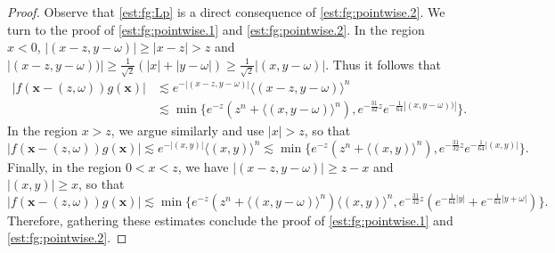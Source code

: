 \documentclass[reqno,10pt]{amsart}
\numberwithin{equation}{section}
\newcommand{\bx}{\mathbf{x}}
\begin{document}
	\begin{proof}
		Observe that \eqref{est:fg:Lp} is a direct consequence of \eqref{est:fg:pointwise.2}. We turn to the proof of \eqref{est:fg:pointwise.1} and \eqref{est:fg:pointwise.2}. In the region $x<0$, $|(x-z,y-\omega)| \ge |x-z|>z$ and $|(x-z,y-\omega))| \ge \frac1{\sqrt{2}}(|x|+|y-\omega|) \ge \frac1{\sqrt{2}}|(x,y-\omega)|$. Thus it follows that
		\begin{align*}
		  \left|f(\bx-(z,\omega))g(\bx) \right| & \lesssim e^{-|(x-z,y-\omega)|} \langle (x-z,y-\omega) \rangle^n \\ 
   & \lesssim \min\{ e^{-z}(z^n+\langle (x,y-\omega)\rangle^n),e^{-\frac{31}{32}z}e^{-\frac1{64}|(x,y-\omega))|}\} .
		\end{align*}
		In the region $x>z$, we argue similarly and use $|x|>z$, so that 
		\begin{equation*}
			\left|f(\bx-(z,\omega))g(\bx) \right| \lesssim e^{-|(x,y)|} \langle (x,y) \rangle^n \lesssim \min\{ e^{-z}(z^n+\langle (x,y) \rangle^n),e^{-\frac{31}{32}z}e^{-\frac1{64}|(x,y)|}\} .
		\end{equation*}
		Finally, in the region $0<x<z$, we have $|(x-z,y-\omega)| \ge z-x$ and $|(x,y)| \ge x$, so that 
		\begin{equation*}
			\left|f(\bx-(z,\omega))g(\bx) \right| 
			\lesssim \min\{ e^{-z}(z^n+\langle (x,y-\omega) \rangle^n)\langle (x,y) \rangle^n,e^{-\frac{31}{32}z}(e^{-\frac1{64}|y|}+e^{-\frac1{64}|y+\omega|})\} .
		\end{equation*}
		Therefore, gathering these estimates conclude the proof of \eqref{est:fg:pointwise.1} and \eqref{est:fg:pointwise.2}.
	\end{proof}
	
\end{document}
